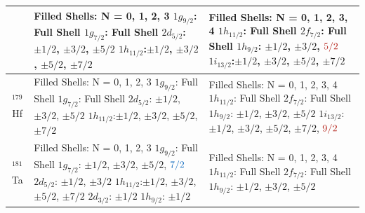 \documentclass[10pt,a4paper, twoside, openright]{report}
\begin{document}
\begin{longtable}{cll}
    &  \pbox{20cm}{Filled Shells: N = 0, 1, 2, 3 \\
    $1g_{9/2}$: Full Shell \\
    $1g_{7/2}$: Full Shell \\
    $2d_{5/2}$: $\pm 1/2$, $\pm 3/2$, $\pm 5/2$ \\
    $1h_{11/2}$:$\pm 1/2$, $\pm 3/2$, $\pm 5/2$, $\pm 7/2$}              
    &  \pbox{20cm}{Filled Shells: N = 0, 1, 2, 3, 4 \\
    $1h_{11/2}$: Full Shell \\
    $2f_{7/2}$: Full Shell \\
    $1h_{9/2}$: $\pm 1/2$, $\pm 3/2$, $\textcolor{BrickRed}{5/2}$ \\
    $1i_{13/2}$:$\pm 1/2$, $\pm 3/2$, $\pm 5/2$, $\pm 7/2$} \\
\midrule
$^{179}$Hf 
    &  \pbox{20cm}{Filled Shells: N = 0, 1, 2, 3 \\
    $1g_{9/2}$: Full Shell \\
    $1g_{7/2}$: Full Shell \\
    $2d_{5/2}$: $\pm 1/2$, $\pm 3/2$, $\pm 5/2$ \\
    $1h_{11/2}$:$\pm 1/2$, $\pm 3/2$, $\pm 5/2$, $\pm 7/2$}          
    &  \pbox{20cm}{Filled Shells: N = 0, 1, 2, 3, 4 \\
    $1h_{11/2}$: Full Shell \\
    $2f_{7/2}$: Full Shell \\
    $1h_{9/2}$: $\pm 1/2$, $\pm 3/2$, $\pm 5/2$ \\
    $1i_{13/2}$:$\pm 1/2$, $\pm 3/2$, $\pm 5/2$, $\pm 7/2$, $\textcolor{BrickRed}{9/2}$} \\
\midrule
$^{181}$Ta 
    &  \pbox{20cm}{Filled Shells: N = 0, 1, 2, 3 \\
    $1g_{9/2}$: Full Shell \\
    $1g_{7/2}$: $\pm 1/2$, $\pm 3/2$, $\pm 5/2$, $\textcolor{RoyalBlue}{7/2}$ \\
    $2d_{5/2}$: $\pm 1/2$, $\pm 3/2$ \\
    $1h_{11/2}$:$\pm 1/2$, $\pm 3/2$, $\pm 5/2$, $\pm 7/2$ \\
    $2d_{3/2}$: $\pm 1/2$ \\
    $1h_{9/2}$: $\pm 1/2$}              
    &  \pbox{20cm}{Filled Shells: N = 0, 1, 2, 3, 4 \\
    $1h_{11/2}$: Full Shell \\
    $2f_{7/2}$: Full Shell \\
    $1h_{9/2}$: $\pm 1/2$, $\pm 3/2$, $\pm {5/2}$ \\
}
\end{longtable}
\end{document}
